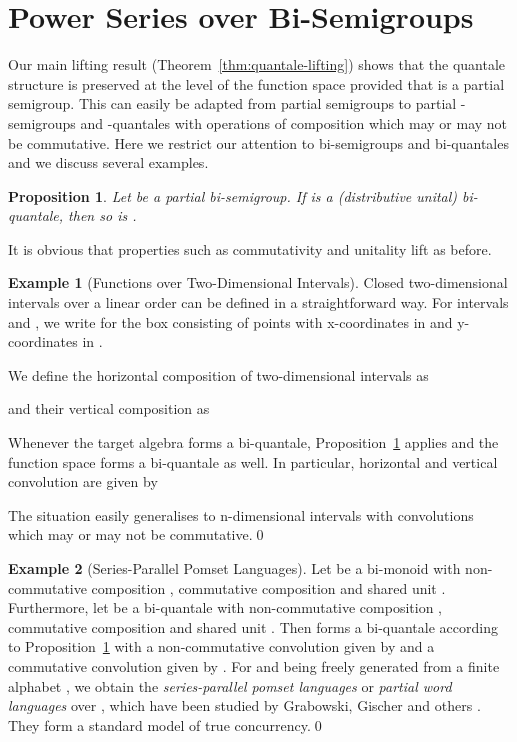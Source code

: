 \documentclass[12pt]{article}
\newtheorem{proposition}{Proposition}
\theoremstyle{definition}
\newtheorem{example}{Example}
\begin{document}
\section{Power Series over Bi-Semigroups}
\label{sec:formal-power-series}

Our main lifting result (Theorem~\ref{thm:quantale-lifting}) shows
that the quantale structure  is preserved at the level of the
function space  provided that  is a partial semigroup.
This can easily be adapted from partial semigroups  to partial
-semigroups and -quantales with  operations of composition
which may or may not be commutative. Here we restrict our attention to
bi-semigroups and bi-quantales and we discuss several examples.
\begin{proposition}\label{prop:biquantale-lifting}
  Let  be a partial bi-semigroup. If
   is a (distributive unital) bi-quantale, then so is
  .
\end{proposition}

It is obvious that properties such as commutativity and unitality lift
as before.

 \begin{example}[Functions over Two-Dimensional Intervals]
   Closed two-dimensional intervals over a linear order can be
   defined in a straightforward way. 
For intervals  and , we write  for the box
   consisting of points with x-coordinates in  and y-coordinates in .
   

  We define the horizontal composition of two-dimensional intervals as
  
  and their vertical composition as
  
  Whenever the target algebra forms a bi-quantale,
  Proposition~\ref{prop:biquantale-lifting} applies and the function
  space forms a bi-quantale as well. In particular, horizontal and
  vertical convolution are given by
  
  The situation easily generalises to n-dimensional intervals with 
  convolutions which may or may not be commutative.\qed
 \end{example}
 \begin{example}[Series-Parallel Pomset Languages]\label{ex:pomsets}
   Let  be a bi-monoid with non-commutative
   composition , commutative composition  and shared unit
   . Furthermore, let  be a bi-quantale with
   non-commutative composition , commutative composition 
   and shared unit . Then  forms a bi-quantale according to
   Proposition~\ref{prop:biquantale-lifting} with a non-commutative
   convolution given by  and a commutative convolution given by
   . For  and  being freely generated from a
   finite alphabet , we obtain the \emph{series-parallel pomset
     languages} or \emph{partial word languages} over , which
   have been studied by Grabowski, Gischer and others
   \cite{Grabowski,Gischer}. They form a standard model of true
   concurrency.\qed
 \end{example}
\end{document}
